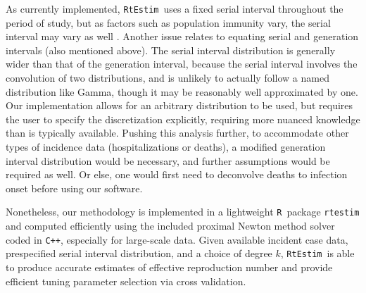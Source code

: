 \documentclass[10pt,letterpaper]{article}
\newcommand{\R}{\texttt{R}}
\newcommand{\cpp}{\texttt{C++}}
\def\RtEstim{\texttt{RtEstim}}
\newcommand{\citep}[1]{\cite{#1}}
\begin{document}
As currently implemented, \RtEstim\ uses a fixed serial interval throughout the
period of study, but as factors such as population immunity vary, the serial
interval may vary as well \citep{nash2023estimating}.  
Another issue relates to equating serial and generation intervals (also
mentioned above). The serial interval distribution is generally wider than that
of the generation interval, because the serial interval involves the convolution
of two distributions, and is unlikely to actually follow a named distribution
like Gamma, though it may be reasonably well approximated by one. Our
implementation allows for an arbitrary distribution to be used, but requires the
user to specify the discretization explicitly, requiring more nuanced knowledge
than is typically available. Pushing this analysis further, to accommodate other
types of incidence data (hospitalizations or deaths), a modified generation
interval distribution would be necessary, and further assumptions would be
required as well. Or else, one would first need to deconvolve deaths to
infection onset before using our software.


Nonetheless, our methodology is implemented in a
lightweight \R\ package \texttt{rtestim} and computed efficiently using the
included proximal Newton method solver coded in \cpp, especially for large-scale
data. Given available incident case data, prespecified serial interval
distribution, and a choice of degree $k$, \RtEstim\ is able to produce
accurate estimates of effective reproduction number and provide efficient
tuning parameter selection via cross validation. 
\end{document}
